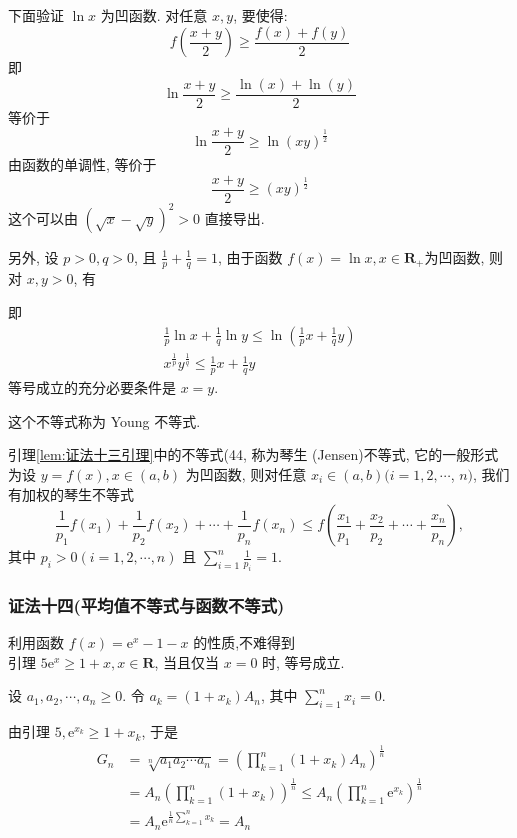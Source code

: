 下面验证 $\ln x$ 为凹函数. 对任意 $x, y$, 要使得:
$$
f\left(\frac{x+y}{2}\right) \geqslant \frac{f(x)+f(y)}{2}
$$
即
$$
\ln \frac{x+y}{2} \geqslant \frac{\ln (x)+\ln (y)}{2}
$$
等价于
$$
\ln \frac{x+y}{2} \geqslant \ln (x y)^{\frac{1}{2}}
$$
由函数的单调性, 等价于
$$
\frac{x+y}{2} \geqslant(x y)^{\frac{1}{2}}
$$
这个可以由 $(\sqrt{x}-\sqrt{y})^{2}>0$ 直接导出.

另外, 设 $p>0, q>0$, 且 $\frac{1}{p}+\frac{1}{q}=1$, 由于函数 $f(x)=\ln x, x \in \mathbf{R}_{+}$为凹函数, 则对 $x, y>0$, 有

即
$$
\begin{gathered}
\frac{1}{p} \ln x+\frac{1}{q} \ln y \leqslant \ln \left(\frac{1}{p} x+\frac{1}{q} y\right) \\
x^{\frac{1}{p}} y^{\frac{1}{q}} \leqslant \frac{1}{p} x+\frac{1}{q} y
\end{gathered}
$$
等号成立的充分必要条件是 $x=y$.

这个不等式称为 Young 不等式.

\begin{note}
引理\ref{lem:证法十三引理}中的不等式(44, 称为琴生 (Jensen)不等式, 它的一般形式为设 $y=f(x), x \in(a, b)$ 为凹函数, 则对任意 $x_{i} \in(a, b)(i=1,2, \cdots$, $n)$, 我们有加权的琴生不等式
$$
\frac{1}{p_{1}} f\left(x_{1}\right)+\frac{1}{p_{2}} f\left(x_{2}\right)+\cdots+\frac{1}{p_{n}} f\left(x_{n}\right) \leqslant f\left(\frac{x_{1}}{p_{1}}+\frac{x_{2}}{p_{2}}+\cdots+\frac{x_{n}}{p_{n}}\right),
$$
其中 $p_{i}>0(i=1,2, \cdots, n)$ 且 $\sum_{i=1}^{n} \frac{1}{p_{i}}=1$.
\end{note}


\subsubsection*{证法十四(平均值不等式与函数不等式)
}
利用函数 $f(x)=\mathrm{e}^{x}-1-x$ 的性质,不难得到\\
引理 $5 \mathrm{e}^{x} \geqslant 1+x, x \in \mathbf{R}$, 当且仅当 $x=0$ 时, 等号成立.

设 $a_{1}, a_{2}, \cdots, a_{n} \geqslant 0$. 令 $a_{k}=\left(1+x_{k}\right) A_{n}$, 其中 $\sum_{i=1}^{n} x_{i}=0$.

由引理 $5, \mathrm{e}^{x_{k}} \geqslant 1+x_{k}$, 于是
$$
\begin{aligned}
G_{n} & =\sqrt[n]{a_{1} a_{2} \cdots a_{n}}=\left(\prod_{k=1}^{n}\left(1+x_{k}\right) A_{n}\right)^{\frac{1}{n}} \\
& =A_{n}\left(\prod_{k=1}^{n}\left(1+x_{k}\right)\right)^{\frac{1}{n}} \leqslant A_{n}\left(\prod_{k=1}^{n} \mathrm{e}^{x_{k}}\right)^{\frac{1}{n}} \\
& =A_{n} \mathrm{e}^{\frac{1}{n} \sum_{k=1}^{n} x_{k}}=A_{n}
\end{aligned}
$$

